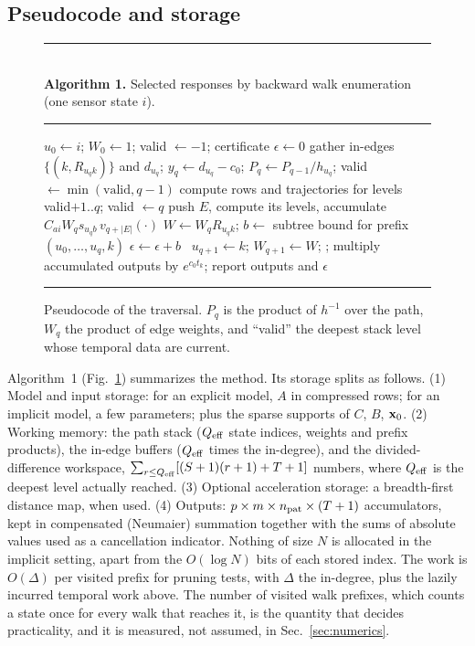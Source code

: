 \documentclass[aps,pra,superscriptaddress,floatfix,longbibliography,twocolumn]{revtex4-2}
\newcommand{\bx}{{\bf x}}
\begin{document}
\subsection{Pseudocode and storage}
\begin{figure}[t]
\small
\noindent\rule{\linewidth}{0.4pt}\\[-2pt]
\textbf{Algorithm 1.} Selected responses by backward walk enumeration (one sensor state $i$).\\[-6pt]
\noindent\rule{\linewidth}{0.4pt}
\begin{algorithmic}[1]
\State $u_0\gets i$; $W_0\gets1$; valid $\gets-1$; certificate $\epsilon\gets0$
  \State gather in-edges $\{(k,R_{u_qk})\}$ and $d_{u_q}$; $y_q\gets d_{u_q}-c_0$; $P_q\gets P_{q-1}/h_{u_q}$; valid $\gets\min(\text{valid},q-1)$
     \State compute rows and trajectories for levels valid$+1..q$; valid $\gets q$
      push $E$, compute its levels, accumulate $C_{ai}W_q s_{u_qb}\,v_{q+|E|}(\cdot)$ \EndFor
  \EndIf
     \State $W\gets W_qR_{u_qk}$; $b\gets$ subtree bound for prefix $(u_0,\dots,u_q,k)$ 
      $\epsilon\gets\epsilon+b$ 
     \Else\ $u_{q+1}\gets k$; $W_{q+1}\gets W$; 
     \EndIf
  \EndFor
\EndProcedure
\State {}; multiply accumulated outputs by $e^{c_0t_k}$; report outputs and $\epsilon$
\end{algorithmic}
\noindent\rule{\linewidth}{0.4pt}
\caption{Pseudocode of the traversal. $P_q$ is the product of $h^{-1}$ over the path, $W_q$ the product of edge weights, and ``valid'' the deepest stack level whose temporal data are current.}\label{alg:walk}
\end{figure}
Algorithm~1 (Fig.~\ref{alg:walk}) summarizes the method. Its storage splits as follows. (1) Model and input storage: for an explicit model, $A$ in compressed rows; for an implicit model, a few parameters; plus the sparse supports of $C$, $B$, $\bx_0$. (2) Working memory: the path stack ($Q_{\rm eff}$ state indices, weights and prefix products), the in-edge buffers ($Q_{\rm eff}$ times the in-degree), and the divided-difference workspace, $\sum_{r\le Q_{\rm eff}}[(S+1)(r+1)+T+1]$ numbers, where $Q_{\rm eff}$ is the deepest level actually reached. (3) Optional acceleration storage: a breadth-first distance map, when used. (4) Outputs: $p\times m\times n_{\rm pat}\times(T+1)$ accumulators, kept in compensated (Neumaier) summation together with the sums of absolute values used as a cancellation indicator. Nothing of size $N$ is allocated in the implicit setting, apart from the $O(\log N)$ bits of each stored index. The work is $O(\Delta)$ per visited prefix for pruning tests, with $\Delta$ the in-degree, plus the lazily incurred temporal work above. The number of visited walk prefixes, which counts a state once for every walk that reaches it, is the quantity that decides practicality, and it is measured, not assumed, in Sec.~\ref{sec:numerics}.
\end{document}

